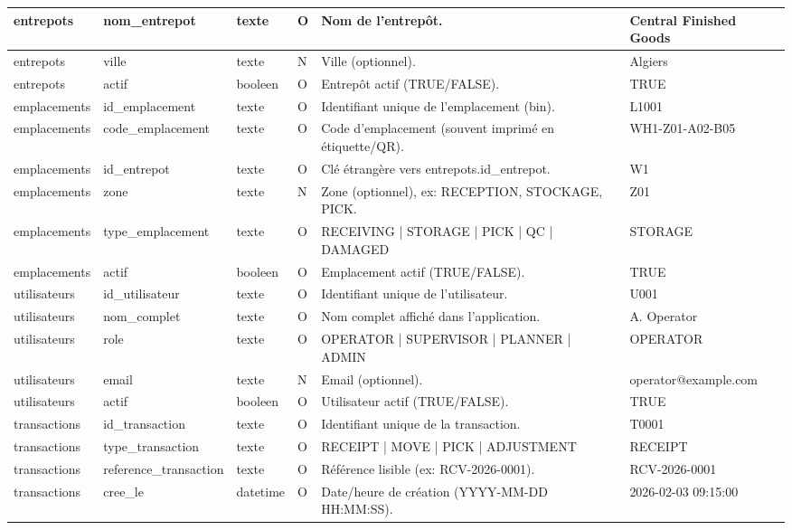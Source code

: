 \documentclass[a4paper,11pt]{article}
\begin{document}
\begin{longtable}{|l|l|l|l|l|l|}
 entrepots & nom\_entrepot & texte & O & Nom de l'entrepôt. & Central Finished Goods \\ \hline
\rowcolor{rowgray} entrepots & ville & texte & N & Ville (optionnel). & Algiers \\ \hline
 entrepots & actif & booleen & O & Entrepôt actif (TRUE/FALSE). & TRUE \\ \hline
\rowcolor{rowgray} emplacements & id\_emplacement & texte & O & Identifiant unique de l'emplacement (bin). & L1001 \\ \hline
 emplacements & code\_emplacement & texte & O & Code d'emplacement (souvent imprimé en étiquette/QR). & WH1-Z01-A02-B05 \\ \hline
\rowcolor{rowgray} emplacements & id\_entrepot & texte & O & Clé étrangère vers entrepots.id\_entrepot. & W1 \\ \hline
 emplacements & zone & texte & N & Zone (optionnel), ex: RECEPTION, STOCKAGE, PICK. & Z01 \\ \hline
\rowcolor{rowgray} emplacements & type\_emplacement & texte & O & RECEIVING | STORAGE | PICK | QC | DAMAGED & STORAGE \\ \hline
 emplacements & actif & booleen & O & Emplacement actif (TRUE/FALSE). & TRUE \\ \hline
\rowcolor{rowgray} utilisateurs & id\_utilisateur & texte & O & Identifiant unique de l'utilisateur. & U001 \\ \hline
 utilisateurs & nom\_complet & texte & O & Nom complet affiché dans l'application. & A. Operator \\ \hline
\rowcolor{rowgray} utilisateurs & role & texte & O & OPERATOR | SUPERVISOR | PLANNER | ADMIN & OPERATOR \\ \hline
 utilisateurs & email & texte & N & Email (optionnel). & operator@example.com \\ \hline
\rowcolor{rowgray} utilisateurs & actif & booleen & O & Utilisateur actif (TRUE/FALSE). & TRUE \\ \hline
 transactions & id\_transaction & texte & O & Identifiant unique de la transaction. & T0001 \\ \hline
\rowcolor{rowgray} transactions & type\_transaction & texte & O & RECEIPT | MOVE | PICK | ADJUSTMENT & RECEIPT \\ \hline
 transactions & reference\_transaction & texte & O & Référence lisible (ex: RCV-2026-0001). & RCV-2026-0001 \\ \hline
\rowcolor{rowgray} transactions & cree\_le & datetime & O & Date/heure de création (YYYY-MM-DD HH:MM:SS). & 2026-02-03 09:15:00 \\ \hline

\end{longtable}
\end{document}
